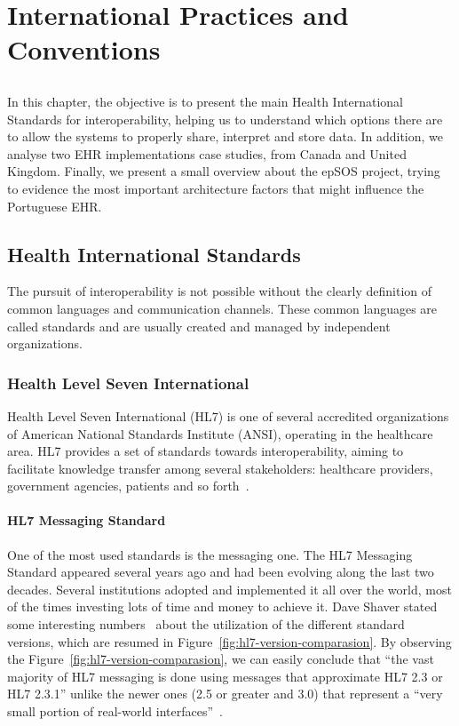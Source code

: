 \chapter{International Practices and Conventions}\label{chap:standards}

\section*{}

In this chapter, the objective is to present the main Health International Standards for interoperability, helping us to understand which options there are to allow the systems to properly share, interpret and store data. In addition, we analyse two EHR implementations case studies, from Canada and United Kingdom. Finally, we present a small overview about the epSOS project, trying to evidence the most important architecture factors that might influence the Portuguese EHR.


\section{Health International Standards}

The pursuit of interoperability is not possible without the clearly definition of common languages and communication channels. These common languages are called standards and are usually created and managed by independent organizations.

\subsection{Health Level Seven International}

Health Level Seven International (HL7) is one of several accredited organizations of American National Standards Institute (ANSI), operating in the healthcare area. HL7 provides a set of standards towards interoperability, aiming to facilitate knowledge transfer among several stakeholders: healthcare providers, government agencies, patients and so forth~\citep{Seven}.


\subsubsection{HL7 Messaging Standard}

One of the most used standards is the messaging one. The HL7 Messaging Standard appeared several years ago and had been evolving along the last two decades. Several institutions adopted and implemented it all over the world, most of the times investing lots of time and money to achieve it. Dave Shaver stated some interesting numbers~\citep{Shaver2010} about the utilization of the different standard versions, which are resumed in Figure~\ref{fig:hl7-version-comparasion}. By observing the Figure~\ref{fig:hl7-version-comparasion}, we can easily conclude that ``the vast majority of HL7 messaging is done using messages that approximate HL7 2.3 or HL7 2.3.1'' unlike the newer ones (2.5 or greater and 3.0) that represent a ``very small portion of real-world interfaces''~\citep{Shaver2010}.


